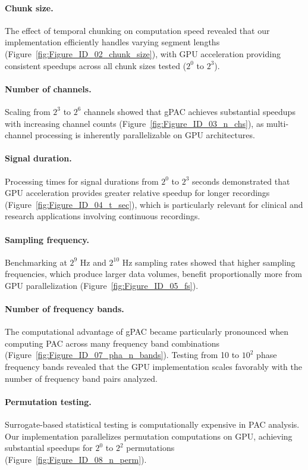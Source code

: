 \paragraph{Chunk size.} The effect of temporal chunking on computation speed revealed that our implementation efficiently handles varying segment lengths (Figure~\ref{fig:Figure_ID_02_chunk_size}), with GPU acceleration providing consistent speedups across all chunk sizes tested ($2^0$ to $2^3$).

\paragraph{Number of channels.} Scaling from $2^3$ to $2^6$ channels showed that gPAC achieves substantial speedups with increasing channel counts (Figure~\ref{fig:Figure_ID_03_n_chs}), as multi-channel processing is inherently parallelizable on GPU architectures.

\paragraph{Signal duration.} Processing times for signal durations from $2^0$ to $2^3$ seconds demonstrated that GPU acceleration provides greater relative speedup for longer recordings (Figure~\ref{fig:Figure_ID_04_t_sec}), which is particularly relevant for clinical and research applications involving continuous recordings.

\paragraph{Sampling frequency.} Benchmarking at $2^9$ Hz and $2^{10}$ Hz sampling rates showed that higher sampling frequencies, which produce larger data volumes, benefit proportionally more from GPU parallelization (Figure~\ref{fig:Figure_ID_05_fs}).

\paragraph{Number of frequency bands.} The computational advantage of gPAC became particularly pronounced when computing PAC across many frequency band combinations (Figure~\ref{fig:Figure_ID_07_pha_n_bands}). Testing from 10 to $10^2$ phase frequency bands revealed that the GPU implementation scales favorably with the number of frequency band pairs analyzed.

\paragraph{Permutation testing.} Surrogate-based statistical testing is computationally expensive in PAC analysis. Our implementation parallelizes permutation computations on GPU, achieving substantial speedups for $2^0$ to $2^2$ permutations (Figure~\ref{fig:Figure_ID_08_n_perm}).

